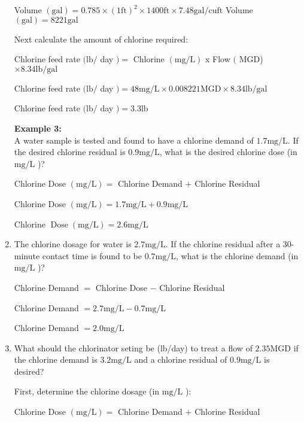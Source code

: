 \documentclass{article}
\begin{document}
\begin{enumerate}
Volume $(\mathrm{gal})=0.785 \times(1 \mathrm{ft})^{2} \times 1400 \mathrm{ft} \times 7.48 \mathrm{gal} / \mathrm{cu} \mathrm{ft}$ Volume $(\mathrm{gal})=8221 \mathrm{gal}$

Next calculate the amount of chlorine required:

Chlorine feed rate $(\mathrm{lb} /$ day $)=$ Chlorine $(\mathrm{mg} / \mathrm{L})$ x Flow $($ MGD) $\times 8.34 \mathrm{lb} / \mathrm{gal}$

Chlorine feed rate $(\mathrm{lb} /$ day $)=48 \mathrm{mg} / \mathrm{L} \times 0.008221 \mathrm{MGD} \times 8.34 \mathrm{lb} / \mathrm{gal}$

Chlorine feed rate $(\mathrm{lb} /$ day $)=3.3 \mathrm{lb}$

\textbf{Example 3:}\\
A water sample is tested and found to have a chlorine demand of $1.7 \mathrm{mg} / \mathrm{L}$. If the desired chlorine residual is $0.9 \mathrm{mg} / \mathrm{L}$, what is the desired chlorine dose (in $\mathrm{mg} / \mathrm{L}$ )?

Chlorine Dose $(\mathrm{mg} / \mathrm{L})=$ Chlorine Demand $+$ Chlorine Residual

Chlorine Dose $(\mathrm{mg} / \mathrm{L})=1.7 \mathrm{mg} / \mathrm{L}+0.9 \mathrm{mg} / \mathrm{L}$

Chlorine $\operatorname{Dose}(\mathrm{mg} / \mathrm{L})=2.6 \mathrm{mg} / \mathrm{L}$

\item The chlorine dosage for water is $2.7 \mathrm{mg} / \mathrm{L}$. If the chlorine residual after a 30-minute contact time is found to be $0.7 \mathrm{mg} / \mathrm{L}$, what is the chlorine demand (in $\mathrm{mg} / \mathrm{L}$ )?

Chlorine Demand $=$ Chlorine Dose $-$ Chlorine Residual

Chlorine Demand $=2.7 \mathrm{mg} / \mathrm{L}-0.7 \mathrm{mg} / \mathrm{L}$

Chlorine Demand $=2.0 \mathrm{mg} / \mathrm{L}$

\item What should the chlorinator seting be (lb/day) to treat a flow of $2.35 \mathrm{MGD}$ if the chlorine demand is $3.2 \mathrm{mg} / \mathrm{L}$ and a chlorine residual of $0.9 \mathrm{mg} / \mathrm{L}$ is desired?

First, determine the chlorine dosage (in $\mathrm{mg} / \mathrm{L}$ ):

Chlorine Dose $(\mathrm{mg} / \mathrm{L})=$ Chlorine Demand $+$ Chlorine Residual


\end{enumerate}
\end{document}

